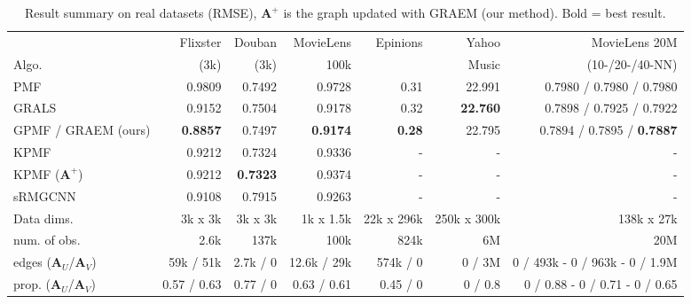 \documentclass{article}
\theoremstyle{plain}
\theoremstyle{definition}
\theoremstyle{remark}
\def\*#1{\boldsymbol{#1}}
\begin{document}
\begin{table*}[h]

\caption{Result summary on real datasets (RMSE), $\*A^+$ is the graph updated with GRAEM (our method). Bold = best result.}
\label{tab:RMSEsComputationalComplexity}
\begin{footnotesize}
\begin{sc}
\hskip-3.2cm\begin{tabular}{lrrrrrr}
\toprule
&  Flixster &Douban&MovieLens& Epinions & Yahoo & MovieLens 20M \\
Algo.  &  (3k) &  (3k) & 100k &  &  Music &  (10-/20-/40-NN)\\
\midrule
PMF & 0.9809 & 0.7492  & 0.9728 & 0.31& 22.991 & 0.7980 / 0.7980 / 0.7980\\
GRALS & 0.9152 & 0.7504  & 0.9178 & 0.32& \textbf{22.760} & 0.7898 / 0.7925 / 0.7922\\
GPMF / GRAEM (\scriptsize{ours}) & \textbf{0.8857} & 0.7497 & \textbf{0.9174} & \textbf{0.28} & 22.795 & 0.7894 / 0.7895 / \textbf{0.7887}\\
KPMF & 0.9212 & 0.7324 & 0.9336 & - & - & - \\
KPMF ($\*A^+$)  & 0.9212 & \textbf{0.7323} & 0.9374 & - & - & - \\
sRMGCNN & 0.9108 & 0.7915  & 0.9263  & - & - & - \\
\midrule
Data dims. & \scriptsize{3k x 3k} & \scriptsize{3k x 3k}  & \scriptsize{1k x 1.5k}  & \scriptsize{22k x 296k} & \scriptsize{250k x 300k} & \scriptsize{138k x 27k} \\
num. of obs. &  2.6k & 137k &  100k & 824k & 6M & 20M \\
\midrule
 edges ($\*A_U$/$\*A_V$) & 59k / 51k & 2.7k / 0 & 12.6k / 29k  & 574k / 0 & 0 / 3M
 &  0 / 493k - 0 / 963k - 0 / 1.9M \\  
 \midrule
 prop. ($\*A_U$/$\*A_V$) & 0.57 / 0.63 & 0.77 / 0 & 0.63 / 0.61 & 0.45 / 0 & 0 / 0.8
 & 0 / 0.88 - 0 / 0.71 - 0 / 0.65 \\  
\bottomrule
\end{tabular}
\end{sc}
\end{footnotesize}
\end{table*}
\end{document}
